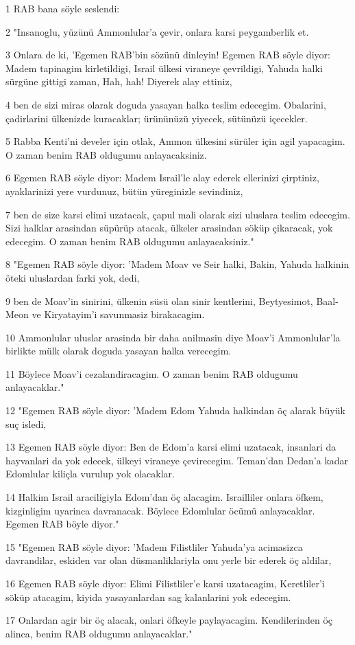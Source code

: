 \par 1 RAB bana söyle seslendi:
\par 2 "Insanoglu, yüzünü Ammonlular'a çevir, onlara karsi peygamberlik et.
\par 3 Onlara de ki, 'Egemen RAB'bin sözünü dinleyin! Egemen RAB söyle diyor: Madem tapinagim kirletildigi, Israil ülkesi viraneye çevrildigi, Yahuda halki sürgüne gittigi zaman, Hah, hah! Diyerek alay ettiniz,
\par 4 ben de sizi miras olarak doguda yasayan halka teslim edecegim. Obalarini, çadirlarini ülkenizde kuracaklar; ürününüzü yiyecek, sütünüzü içecekler.
\par 5 Rabba Kenti'ni develer için otlak, Ammon ülkesini sürüler için agil yapacagim. O zaman benim RAB oldugumu anlayacaksiniz.
\par 6 Egemen RAB söyle diyor: Madem Israil'le alay ederek ellerinizi çirptiniz, ayaklarinizi yere vurdunuz, bütün yüreginizle sevindiniz,
\par 7 ben de size karsi elimi uzatacak, çapul mali olarak sizi uluslara teslim edecegim. Sizi halklar arasindan süpürüp atacak, ülkeler arasindan söküp çikaracak, yok edecegim. O zaman benim RAB oldugumu anlayacaksiniz."
\par 8 "Egemen RAB söyle diyor: 'Madem Moav ve Seir halki, Bakin, Yahuda halkinin öteki uluslardan farki yok, dedi,
\par 9 ben de Moav'in sinirini, ülkenin süsü olan sinir kentlerini, Beytyesimot, Baal-Meon ve Kiryatayim'i savunmasiz birakacagim.
\par 10 Ammonlular uluslar arasinda bir daha anilmasin diye Moav'i Ammonlular'la birlikte mülk olarak doguda yasayan halka verecegim.
\par 11 Böylece Moav'i cezalandiracagim. O zaman benim RAB oldugumu anlayacaklar."
\par 12 "Egemen RAB söyle diyor: 'Madem Edom Yahuda halkindan öç alarak büyük suç isledi,
\par 13 Egemen RAB söyle diyor: Ben de Edom'a karsi elimi uzatacak, insanlari da hayvanlari da yok edecek, ülkeyi viraneye çevirecegim. Teman'dan Dedan'a kadar Edomlular kiliçla vurulup yok olacaklar.
\par 14 Halkim Israil araciligiyla Edom'dan öç alacagim. Israilliler onlara öfkem, kizginligim uyarinca davranacak. Böylece Edomlular öcümü anlayacaklar. Egemen RAB böyle diyor."
\par 15 "Egemen RAB söyle diyor: 'Madem Filistliler Yahuda'ya acimasizca davrandilar, eskiden var olan düsmanliklariyla onu yerle bir ederek öç aldilar,
\par 16 Egemen RAB söyle diyor: Elimi Filistliler'e karsi uzatacagim, Keretliler'i söküp atacagim, kiyida yasayanlardan sag kalanlarini yok edecegim.
\par 17 Onlardan agir bir öç alacak, onlari öfkeyle paylayacagim. Kendilerinden öç alinca, benim RAB oldugumu anlayacaklar."

